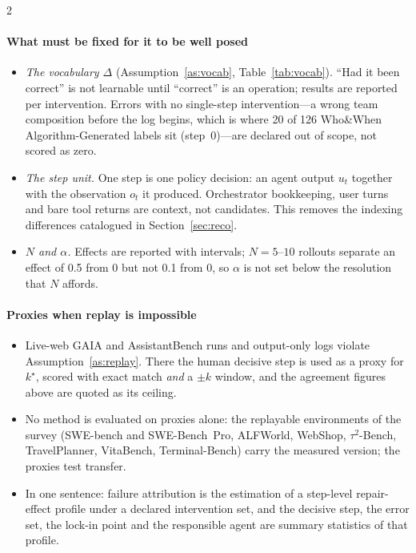 \begin{multicols}{2}
\paragraph{What must be fixed for it to be well posed}
\begin{itemize}[leftmargin=1.1em]
\item \emph{The vocabulary $\Delta$} (Assumption~\ref{as:vocab}, Table~\ref{tab:vocab}). ``Had it been correct'' is not learnable until ``correct'' is an operation; results are reported per intervention. Errors with no single-step intervention---a wrong team composition before the log begins, which is where 20 of 126 Who\&When Algorithm-Generated labels sit (step~0)---are declared out of scope, not scored as zero.
\item \emph{The step unit.} One step is one policy decision: an agent output $u_t$ together with the observation $o_t$ it produced. Orchestrator bookkeeping, user turns and bare tool returns are context, not candidates. This removes the indexing differences catalogued in Section~\ref{sec:reco}.
\item \emph{$N$ and $\alpha$.} Effects are reported with intervals; $N=5$--$10$ rollouts separate an effect of 0.5 from 0 but not 0.1 from 0, so $\alpha$ is not set below the resolution that $N$ affords.
\end{itemize}

\paragraph{Proxies when replay is impossible}
\begin{itemize}[leftmargin=1.1em]
\item Live-web GAIA and AssistantBench runs and output-only logs violate Assumption~\ref{as:replay}. There the human decisive step is used as a proxy for $k^\star$, scored with exact match \emph{and} a $\pm k$ window, and the agreement figures above are quoted as its ceiling.
\item No method is evaluated on proxies alone: the replayable environments of the survey (SWE-bench and SWE-Bench~Pro, ALFWorld, WebShop, $\tau^2$-Bench, TravelPlanner, VitaBench, Terminal-Bench) carry the measured version; the proxies test transfer.
\item In one sentence: failure attribution is the estimation of a step-level repair-effect profile under a declared intervention set, and the decisive step, the error set, the lock-in point and the responsible agent are summary statistics of that profile.
\end{itemize}
\end{multicols}

